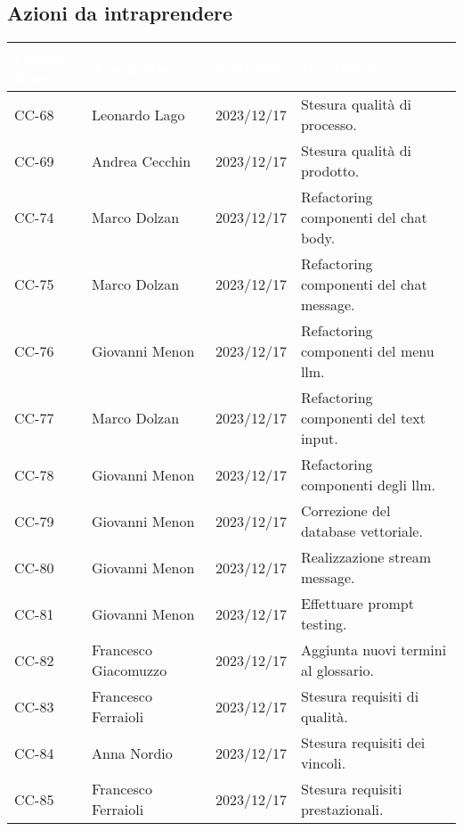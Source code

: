 \subsection{Azioni da intraprendere}
{
    \setlength{\tabcolsep}{10pt}
    \renewcommand{\arraystretch}{1.5}
    \begin{xltabular}{\textwidth}{| l | l | l | X |}
        \hline
        \textbf{\textcolor{white}{Codice issue}} & \textbf{\textcolor{white}{Assegnatario}} & \textbf{\textcolor{white}{Scadenza}} & \textbf{\textcolor{white}{Descrizione}} \\
        \endhead
        \hline
        CC-68 & Leonardo Lago & 2023/12/17 & Stesura qualità di processo. \\
        \hline
        CC-69 & Andrea Cecchin & 2023/12/17 & Stesura qualità di prodotto. \\
        \hline
        CC-74 & Marco Dolzan & 2023/12/17 & Refactoring componenti del chat body.  \\
        \hline
        CC-75 & Marco Dolzan & 2023/12/17 & Refactoring componenti del chat message. \\
        \hline
        CC-76 & Giovanni Menon & 2023/12/17 & Refactoring componenti del menu llm.\\
        \hline
        CC-77 & Marco Dolzan & 2023/12/17 & Refactoring componenti del text input.\\
        \hline
        CC-78 & Giovanni Menon & 2023/12/17 & Refactoring componenti degli llm.\\
        \hline
        CC-79 & Giovanni Menon & 2023/12/17 & Correzione del database vettoriale. \\
        \hline
        CC-80 & Giovanni Menon & 2023/12/17 & Realizzazione stream message. \\
        \hline
        CC-81 & Giovanni Menon & 2023/12/17 & Effettuare prompt testing. \\
        \hline
        CC-82 & Francesco Giacomuzzo & 2023/12/17 & Aggiunta nuovi termini al glossario. \\ 
        \hline
        CC-83 & Francesco Ferraioli & 2023/12/17 & Stesura requisiti di qualità. \\
        \hline
        CC-84 & Anna Nordio & 2023/12/17 & Stesura requisiti dei vincoli. \\
        \hline
        CC-85 & Francesco Ferraioli & 2023/12/17 & Stesura requisiti prestazionali. \\
        \hline

\end{xltabular}}
